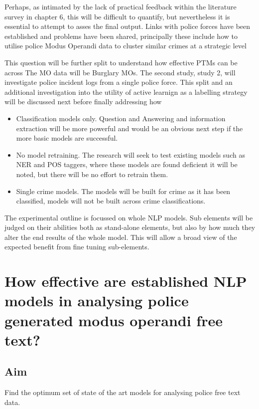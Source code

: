 Perhaps, as intimated by the lack of practical feedback within the literature survey in chapter 6, this will be difficult to quantify, but nevertheless it is essential to attempt to asses the final output. Links with police forces have been established and problems have been shared, principally these include how to utilise police Modus Operandi data to cluster similar crimes at a strategic level

This question will be further split to understand how effective PTMs can be across  The MO data will be Burglary MOs. The second study, study 2, will investigate police incident logs from a single police force. This split and an additional investigation into the utility of active learnign as a labelling strategy will be discussed next before finally addressing how 








\begin{itemize}

\item Classification models only. Question  and Answering and information extraction will be more powerful and would be an obvious next step if the more basic models are successful.

\item No model retraining. The research will seek to test existing models such as NER and POS taggers, where these models are found deficient it will be noted, but there will be no effort to retrain them.

\item Single crime models. The models will be built for crime as it has been classified, models will not be built across crime classifications.

\end{itemize}

The experimental outline is focussed on whole NLP models. Sub elements will be judged on their abilities both as stand-alone elements, but also by how much they alter the end results of the whole model. This will allow a broad view of the expected benefit from fine tuning sub-elements.


\section{How effective are established NLP models in analysing police generated modus operandi free text?}

\subsection{Aim} Find the optimum set of state of the art models for analysing police free text data.


